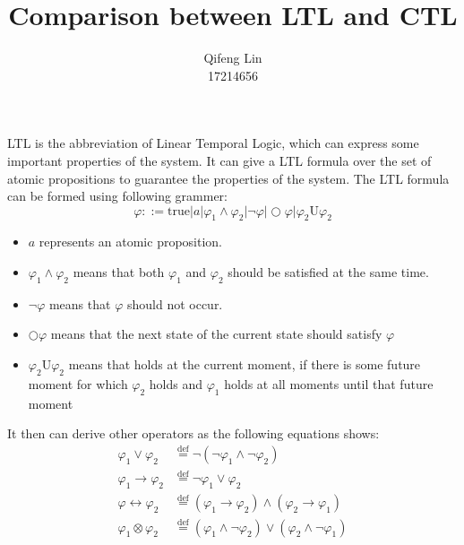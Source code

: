 \documentclass{acmtog} %
\begin{document}

\title{Comparison between LTL and CTL } %

\author{Qifeng Lin \\ 17214656}


\maketitle

    LTL is the abbreviation of Linear Temporal Logic, which can express some important properties of the system. It can give a LTL formula over the set of atomic propositions to guarantee the properties of the system. The LTL formula can be formed using following grammer:
    \begin{equation*}
      \varphi::=\text{true}|a|\varphi_1\wedge\varphi_2|\neg\varphi|\bigcirc\varphi|\varphi_2\text{U}\varphi_2
    \end{equation*}
    \begin{itemize}
      \item $a$ represents an atomic proposition.
      \item $\varphi_1\wedge\varphi_2$ means that both $\varphi_1$ and $\varphi_2$ should be satisfied at the same time.
      \item $\neg\varphi$ means that $\varphi$ should not occur.
      \item $\bigcirc\varphi$ means that the next state of the current state should satisfy $\varphi$
      \item $\varphi_2\text{U}\varphi_2$ means that holds at the current moment, if there is some future moment for which $\varphi_2$ holds and $\varphi_1$ holds at all moments until that future moment
    \end{itemize}
    
    It then can derive other operators as the following equations shows:
    \begin{equation*}
      \begin{aligned}
        \varphi_1\vee\varphi_2 & \overset{\text{def}}{=} \neg(\neg\varphi_1\wedge\neg\varphi_2) \\
        \varphi_1\rightarrow\varphi_2 & \overset{\text{def}}{=}\neg\varphi_1\vee\varphi_2\\
         \varphi\leftrightarrow\varphi_2 & \overset{\text{def}}{=}(  \varphi_1\rightarrow\varphi_2)\wedge(  \varphi_2\rightarrow\varphi_1)\\
         \varphi_1\otimes\varphi_2 & \overset{\text{def}}{=} (\varphi_1\wedge\neg\varphi_2)\vee(\varphi_2\wedge\neg\varphi_1)
      \end{aligned}
    \end{equation*}
    
\end{document}
